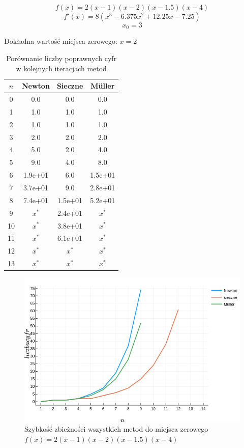 \documentclass[12pt]{article}
\begin{document}
\[f(x) = 2(x-1)(x-2)(x-1.5)(x-4)\]
\[f'(x) = 8(x^3 - 6.375x^2 + 12.25x - 7.25)\]
\[x_0 = 3\]
\begin{center}
    Dokładna wartość miejsca zerowego: $x = 2$
\end{center}

\begin{table}[H]
\centering
\begin{tabular}{|c|c|c|c|}
    \hline
    $n$ & Newton & Sieczne & Müller  \\ \hline\hline
    0  & 0.0     & 0.0     & 0.0     \\ \hline
    1  & 1.0     & 1.0     & 1.0     \\ \hline
    2  & 1.0     & 1.0     & 1.0     \\ \hline
    3  & 2.0     & 2.0     & 2.0     \\ \hline
    4  & 5.0     & 2.0     & 4.0     \\ \hline
    5  & 9.0     & 4.0     & 8.0     \\ \hline
    6  & 1.9e+01 & 6.0     & 1.5e+01 \\ \hline
    7  & 3.7e+01 & 9.0     & 2.8e+01 \\ \hline
    8  & 7.4e+01 & 1.5e+01 & 5.2e+01 \\ \hline
    9  & $x^*$   & 2.4e+01 & $x^*$   \\ \hline
    10 & $x^*$   & 3.8e+01 & $x^*$   \\ \hline
    11 & $x^*$   & 6.1e+01 & $x^*$   \\ \hline
    12 & $x^*$   & $x^*$   & $x^*$   \\ \hline
    13 & $x^*$   & $x^*$   & $x^*$   \\ \hline
\end{tabular}
\caption{Porównanie liczby poprawnych cyfr w kolejnych iteracjach metod}
\label{table:table3}
\end{table}

\begin{figure}[H]
    \centering
    \includegraphics[scale=0.7]{plot3.png}
\caption{Szybkość zbieżności wszystkich metod do miejsca 
            zerowego $f(x) = 2(x-1)(x-2)(x-1.5)(x-4)$}
\label{figure:plot3}
\end{figure}
\end{document}
